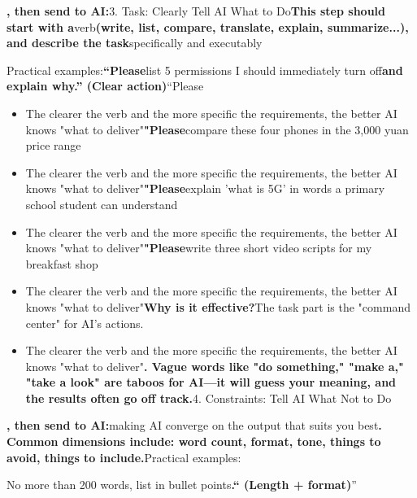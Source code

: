 \textbf{, then send to AI:}3. Task: Clearly Tell AI What to Do\textbf{This step should start with a}verb\textbf{(write, list, compare, translate, explain, summarize...), and describe the task}specifically and executably


Practical examples:\textbf{“Please}list 5 permissions I should immediately turn off\textbf{and explain why.” (Clear action)}“Please


\begin{itemize}
  \item The clearer the verb and the more specific the requirements, the better AI knows "what to deliver"\textbf{"Please}compare these four phones in the 3,000 yuan price range
  \item The clearer the verb and the more specific the requirements, the better AI knows "what to deliver"\textbf{"Please}explain 'what is 5G' in words a primary school student can understand
  \item The clearer the verb and the more specific the requirements, the better AI knows "what to deliver"\textbf{"Please}write three short video scripts for my breakfast shop
  \item The clearer the verb and the more specific the requirements, the better AI knows "what to deliver"\textbf{Why is it effective?}The task part is the "command center" for AI's actions.
  \item The clearer the verb and the more specific the requirements, the better AI knows "what to deliver"\textbf{. Vague words like "do something," "make a," "take a look" are taboos for AI—it will guess your meaning, and the results often go off track.}4. Constraints: Tell AI What Not to Do
\end{itemize}

\textbf{, then send to AI:}making AI converge on the output that suits you best\textbf{. Common dimensions include: word count, format, tone, things to avoid, things to include.}Practical examples:


No more than 200 words, list in bullet points\textbf{.“ (Length + format)}”


